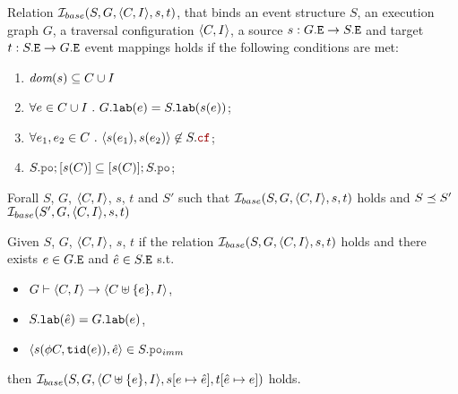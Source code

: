\documentclass[12pt]{article}
\begin{document}
\begin{definition}
  Relation $\mathcal{I}_{base}(S, G, \langle C, I \rangle, s, t)$, that binds an 
  event structure $S$, an \imm execution graph $G$,
  a traversal configuration $\langle C, I \rangle$,
  a source $s : G.{\mathtt{E}} \rightarrow S.{\mathtt{E}}$ and target $t : S.{\mathtt{E}} \rightarrow G.{\mathtt{E}}$ event mappings
  holds if the following conditions are met:
  \begin{enumerate}[label=\textbf{S.\arabic*}]
  \item \label{item:sim-dom-s}
    $\textit{dom}{({s})} \subseteq C \cup I$
  \item \label{item:sim-lab}
    $\forall{e \in C \cup I} ~.~ G.{\mathtt{lab}}(e) = S.{\mathtt{lab}}(s(e))$;
  \item \label{item:sim-cf}
    $\forall{e_1, e_2 \in C} ~.~ \tup{s(e_1), s(e_2)} \not\in S.\lCF$;
  \item \label{item:sim-po-prfx} 
    $S.\lPO;[s(\lC)] \subseteq [s(C)];S.\lPO$;
  \end{enumerate}
\end{definition}

\begin{prop}
  Forall $S$, $G$, $\langle C, I \rangle$, $s$, $t$ and $S'$
  such that $\mathcal{I}_{base}(S, G, \langle C, I \rangle, s, t)$ holds and $S \preceq S'$
  $\mathcal{I}_{base}(S', G, \langle C, I \rangle, s, t)$
\end{prop}

\begin{prop}
  Given $S$, $G$, $\langle C, I \rangle$, $s$, $t$
  if the relation $\mathcal{I}_{base}(S, G, \langle C, I \rangle, s, t)$ holds and 
  there exists $e \in G.{\mathtt{E}}$ and $\hat{e} \in S.{\mathtt{E}}$ s.t.
  \begin{itemize}
  \item $G \vdash \langle C, I \rangle \rightarrow \langle C \uplus \{e\}, I \rangle$,
  \item $S.{\mathtt{lab}}(\hat{e}) = G.{\mathtt{lab}}(e)$,
  \item $\tup{s(\front{C, \lTID(e)}), \hat{e}} \in S.\lPO_{imm}$
  \end{itemize}
  then $\mathcal{I}_{base}(S, G, \langle C \uplus \{e\}, I \rangle, s[e \mapsto \hat{e}], t[\hat{e} \mapsto e])$ holds. 
\end{prop}
\end{document}
